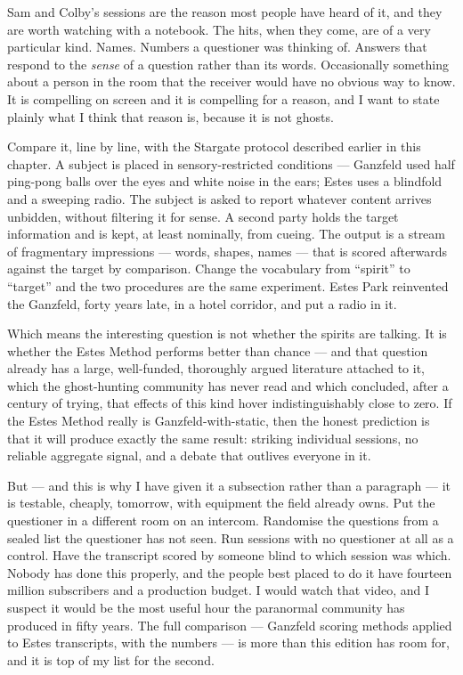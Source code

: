 Sam and Colby's sessions are the reason most people have heard of it, and they are worth watching
with a notebook. The hits, when they come, are of a very particular kind. Names. Numbers a
questioner was thinking of. Answers that respond to the \emph{sense} of a question rather than
its words. Occasionally something about a person in the room that the receiver would have no
obvious way to know. It is compelling on screen and it is compelling for a reason, and I want to
state plainly what I think that reason is, because it is not ghosts.

 Compare it, line by line, with the Stargate protocol described earlier in this
chapter. A subject is placed in sensory-restricted conditions --- Ganzfeld used half ping-pong
balls over the eyes and white noise in the ears; Estes uses a blindfold and a sweeping radio. The
subject is asked to report whatever content arrives unbidden, without filtering it for sense.
A second party holds the target information and is kept, at least nominally, from cueing. The
output is a stream of fragmentary impressions --- words, shapes, names --- that is scored
afterwards against the target by comparison. Change the vocabulary from ``spirit'' to
``target'' and the two procedures are the same experiment. Estes Park reinvented the Ganzfeld,
forty years late, in a hotel corridor, and put a radio in it.

Which means the interesting question is not whether the spirits are talking. It is whether the
Estes Method performs better than chance --- and that question already has a large,
well-funded, thoroughly argued literature attached to it, which the ghost-hunting community has
never read and which concluded, after a century of trying, that effects of this kind hover
indistinguishably close to zero. If the Estes Method really is Ganzfeld-with-static, then the
honest prediction is that it will produce exactly the same result: striking individual sessions,
no reliable aggregate signal, and a debate that outlives everyone in it.

But --- and this is why I have given it a subsection rather than a paragraph --- it is testable,
cheaply, tomorrow, with equipment the field already owns. Put the questioner in a different
room on an intercom. Randomise the questions from a sealed list the questioner has not seen.
Run sessions with no questioner at all as a control. Have the transcript scored by someone
blind to which session was which. Nobody has done this properly, and the people best placed to
do it have fourteen million subscribers and a production budget. I would watch that video, and
I suspect it would be the most useful hour the paranormal community has produced in fifty years.
The full comparison --- Ganzfeld scoring methods applied to Estes transcripts, with the numbers
--- is more than this edition has room for, and it is top of my list for the second.


